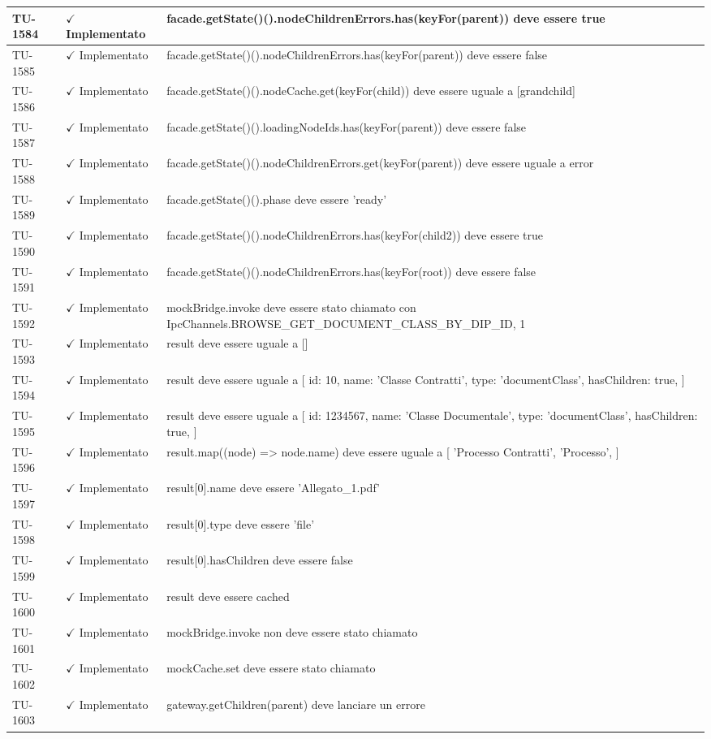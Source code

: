 ﻿\documentclass[a4paper,12pt]{article}
\newcommand{\ok}{\textcolor{green!60!black}{$\checkmark$ Implementato}}
\begin{document}
\begin{longtable}{|p{2cm}|p{3.5cm}|p{9.5cm}|}
\hline
TU-1584 & \ok & facade.getState()().nodeChildrenErrors.has(keyFor(parent)) deve essere true \\
\hline
TU-1585 & \ok & facade.getState()().nodeChildrenErrors.has(keyFor(parent)) deve essere false \\
\hline
TU-1586 & \ok & facade.getState()().nodeCache.get(keyFor(child)) deve essere uguale a [grandchild] \\
\hline
TU-1587 & \ok & facade.getState()().loadingNodeIds.has(keyFor(parent)) deve essere false \\
\hline
TU-1588 & \ok & facade.getState()().nodeChildrenErrors.get(keyFor(parent)) deve essere uguale a error \\
\hline
TU-1589 & \ok & facade.getState()().phase deve essere 'ready' \\
\hline
TU-1590 & \ok & facade.getState()().nodeChildrenErrors.has(keyFor(child2)) deve essere true \\
\hline
TU-1591 & \ok & facade.getState()().nodeChildrenErrors.has(keyFor(root)) deve essere false \\
\hline
TU-1592 & \ok & mockBridge.invoke deve essere stato chiamato con IpcChannels.BROWSE\_GET\_DOCUMENT\_CLASS\_BY\_DIP\_ID, 1 \\
\hline
TU-1593 & \ok & result deve essere uguale a [] \\
\hline
TU-1594 & \ok & result deve essere uguale a [ { id: 10, name: 'Classe Contratti', type: 'documentClass', hasChildren: true, } ] \\
\hline
TU-1595 & \ok & result deve essere uguale a [ { id: 1234567, name: 'Classe Documentale', type: 'documentClass', hasChildren: true, } ] \\
\hline
TU-1596 & \ok & result.map((node) => node.name) deve essere uguale a [ 'Processo Contratti', 'Processo', ] \\
\hline
TU-1597 & \ok & result[0].name deve essere 'Allegato\_1.pdf' \\
\hline
TU-1598 & \ok & result[0].type deve essere 'file' \\
\hline
TU-1599 & \ok & result[0].hasChildren deve essere false \\
\hline
TU-1600 & \ok & result deve essere cached \\
\hline
TU-1601 & \ok & mockBridge.invoke non deve essere stato chiamato \\
\hline
TU-1602 & \ok & mockCache.set deve essere stato chiamato \\
\hline
TU-1603 & \ok & gateway.getChildren(parent) deve lanciare un errore \\

\end{longtable}
\end{document}
